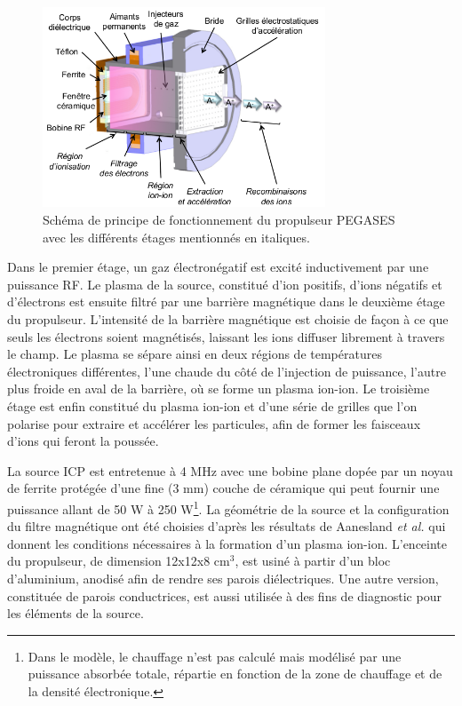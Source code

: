 \begin{refsection}
\begin{figure}[!htbp]
\centering
\includegraphics[width=0.75\textwidth]{figures/4-pegases3D.png}
{\caption{Schéma de principe de fonctionnement du propulseur PEGASES avec les
différents étages mentionnés en italiques\parencite{Popelier}.}
\label{4-pegases3D}}
\end{figure}

Dans le premier étage, un gaz électronégatif est
excité inductivement par une puissance RF.
Le plasma de la source, constitué d'ion positifs, d'ions négatifs et d'électrons
est ensuite filtré par une barrière magnétique dans le deuxième étage du
propulseur. L'intensité de la barrière magnétique est choisie de façon à ce que
seuls les électrons soient magnétisés, laissant les ions diffuser librement à
travers le champ. Le plasma se sépare ainsi en deux régions de températures
électroniques différentes, l'une chaude du côté de l'injection de puissance,
l'autre plus froide en aval de la barrière, où se forme un plasma
ion-ion. Le troisième étage est enfin constitué du plasma ion-ion et
d'une série de grilles que l'on polarise pour extraire et accélérer les
particules, afin de former les faisceaux d'ions qui feront la poussée. 

La source ICP est entretenue à 4 MHz avec une bobine plane dopée par un noyau de
ferrite protégée d'une fine (3 mm) couche de céramique\parencite{Godyak} qui
peut fournir une puissance allant de 50 W à 250 W\footnote{Dans le modèle, 
le chauffage n'est pas calculé mais modélisé par une puissance
absorbée totale, répartie en fonction de la zone de chauffage et de la densité
électronique.}. La géométrie de la source et la configuration du filtre magnétique ont été choisies d'après les résultats de Aanesland \emph{et al.}\parencite{Aanesland} qui donnent les conditions nécessaires à la
formation d'un plasma ion-ion. L'enceinte du propulseur, de dimension
12x12x8 cm$^3$, est usiné à partir d'un bloc d'aluminium, anodisé afin de rendre
ses parois diélectriques. Une autre version, constituée de parois conductrices,
est aussi utilisée à des fins de diagnostic pour les éléments de la source.


\end{refsection}
